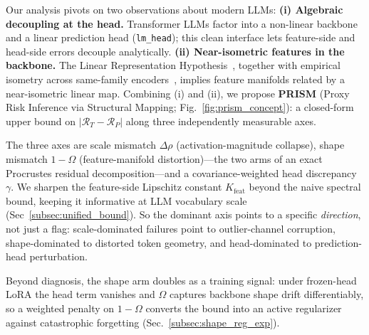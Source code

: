 Our analysis pivots on two observations about modern LLMs:
\textbf{(i) Algebraic decoupling at the head.} Transformer LLMs factor into a non-linear backbone and a linear prediction head (\texttt{lm\_head}); this clean interface lets feature-side and head-side errors decouple analytically.
\textbf{(ii) Near-isometric features in the backbone.} The Linear Representation Hypothesis~\cite{park2023linear}, together with empirical isometry across same-family encoders~\cite{moschella2022relative}, implies feature manifolds related by a near-isometric linear map.
Combining (i) and (ii), we propose \textbf{PRISM} (Proxy Risk Inference via Structural Mapping; Fig.~\ref{fig:prism_concept}): a closed-form upper bound on $|\mathcal{R}_T - \mathcal{R}_P|$ along three independently measurable axes.

The three axes are scale mismatch $\Delta\rho$ (activation-magnitude collapse), shape mismatch $1-\Omega$ (feature-manifold distortion)---the two arms of an exact Procrustes residual decomposition---and a covariance-weighted head discrepancy $\gamma$. We sharpen the feature-side Lipschitz constant $K_{\mathrm{feat}}$ beyond the naive spectral bound, keeping it informative at LLM vocabulary scale (Sec~\ref{subsec:unified_bound}). So the dominant axis points to a specific \emph{direction}, not just a flag: scale-dominated failures point to outlier-channel corruption, shape-dominated to distorted token geometry, and head-dominated to prediction-head perturbation.

Beyond diagnosis, the shape arm doubles as a training signal: under frozen-head LoRA the head term vanishes and $\Omega$ captures backbone shape drift differentiably, so a weighted penalty on $1-\Omega$ converts the bound into an active regularizer against catastrophic forgetting (Sec.~\ref{subsec:shape_reg_exp}).

